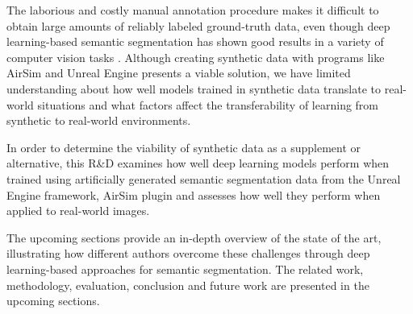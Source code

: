 \documentclass[../report.tex]{subfiles}
\begin{document}
    The laborious and costly manual annotation procedure makes it difficult to obtain large amounts of reliably labeled ground-truth data, even though deep learning-based semantic segmentation has shown good results in a variety of computer vision tasks \cite{cordts2016cityscapes}. Although creating synthetic data with programs like AirSim and Unreal Engine presents a viable solution, we have limited understanding about how well models trained in synthetic data translate to real-world situations and what factors affect the transferability of learning from synthetic to real-world environments.  

    In order to determine the viability of synthetic data as a supplement or alternative, this R\&D examines how well deep learning models perform when trained using artificially generated semantic segmentation data from the Unreal Engine framework, AirSim plugin and assesses how well they perform when applied to real-world images. 
    
    The upcoming sections provide an in-depth overview of the state of the art, illustrating how different authors overcome these challenges through deep learning-based approaches for semantic segmentation. The related work, methodology, evaluation, conclusion and future work are presented in the upcoming sections.   
\end{document}
